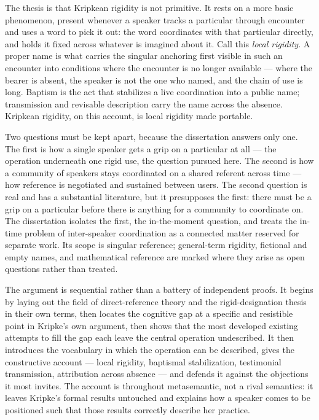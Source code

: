\documentclass[12pt,a4paper]{article}
\begin{document}
The thesis is that Kripkean rigidity is not primitive. It rests on a more basic phenomenon, present whenever a speaker tracks a particular through encounter and uses a word to pick it out: the word coordinates with that particular directly, and holds it fixed across whatever is imagined about it. Call this \emph{local rigidity}. A proper name is what carries the singular anchoring first visible in such an encounter into conditions where the encounter is no longer available --- where the bearer is absent, the speaker is not the one who named, and the chain of use is long. Baptism is the act that stabilizes a live coordination into a public name; transmission and revisable description carry the name across the absence. Kripkean rigidity, on this account, is local rigidity made portable.

Two questions must be kept apart, because the dissertation answers only one. The first is how a single speaker gets a grip on a particular at all --- the operation underneath one rigid use, the question pursued here. The second is how a community of speakers stays coordinated on a shared referent across time --- how reference is negotiated and sustained between users. The second question is real and has a substantial literature, but it presupposes the first: there must be a grip on a particular before there is anything for a community to coordinate on. The dissertation isolates the first, the in-the-moment question, and treats the in-time problem of inter-speaker coordination as a connected matter reserved for separate work. Its scope is singular reference; general-term rigidity, fictional and empty names, and mathematical reference are marked where they arise as open questions rather than treated.

The argument is sequential rather than a battery of independent proofs. It begins by laying out the field of direct-reference theory and the rigid-designation thesis in their own terms, then locates the cognitive gap at a specific and resistible point in Kripke's own argument, then shows that the most developed existing attempts to fill the gap each leave the central operation undescribed. It then introduces the vocabulary in which the operation can be described, gives the constructive account --- local rigidity, baptismal stabilization, testimonial transmission, attribution across absence --- and defends it against the objections it most invites. The account is throughout metasemantic, not a rival semantics: it leaves Kripke's formal results untouched and explains how a speaker comes to be positioned such that those results correctly describe her practice.
\end{document}
